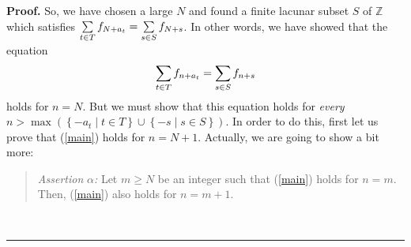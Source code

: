 \documentclass[numbers=enddot,12pt,final,onecolumn,notitlepage]{scrartcl}%
\numberwithin{exer}{section}
\theoremstyle{definition}
\newenvironment{statement}{\begin{quote}}{\end{quote}}
\newenvironment{proof}[1][Proof]{\noindent\textbf{#1.} }{\ \rule{0.5em}{0.5em}}
\let\sumnonlimits\sum
\renewcommand{\sum}{\sumnonlimits\limits}
\begin{document}
\begin{proof}
So, we have chosen a large $N$ and found a finite lacunar subset $S$ of
$\mathbb{Z}$ which satisfies $\sum\limits_{t\in T}f_{N+a_{t}}=\sum
\limits_{s\in S}f_{N+s}$. In other words, we have showed that the equation
\begin{equation}
\sum\limits_{t\in T}f_{n+a_{t}}=\sum\limits_{s\in S}f_{n+s} \label{main}%
\end{equation}
holds for $n=N$. But we must show that this equation holds for \textit{every}
$n>\max\left(  \left\{  -a_{t}\mid t\in T\right\}  \cup\left\{  -s\mid s\in
S\right\}  \right)  $. In order to do this, first let us prove that
(\ref{main}) holds for $n=N+1$. Actually, we are going to show a bit more:

\begin{statement}
\textit{Assertion }$\alpha$\textit{:} Let $m\geq N$ be an integer such that
(\ref{main}) holds for $n=m$. Then, (\ref{main}) also holds for $n=m+1$.
\end{statement}


\end{proof}
\end{document}
